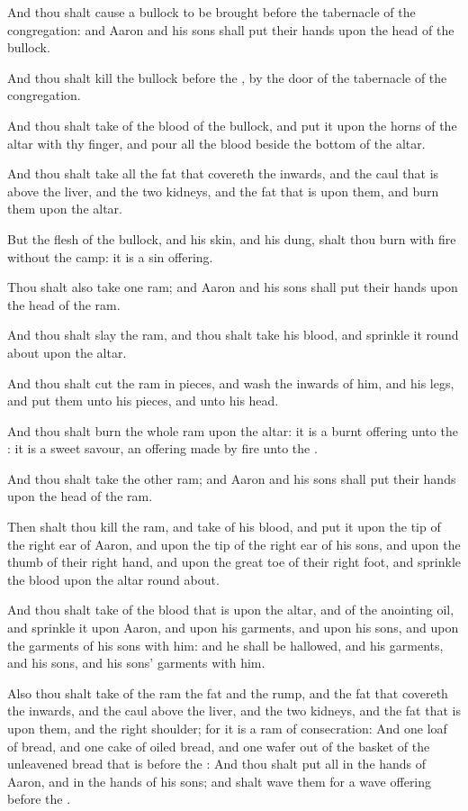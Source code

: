 \verse And thou shalt cause a bullock to be brought before the
tabernacle of the congregation: and Aaron and his sons shall put their
hands upon the head of the bullock.

\verse And thou shalt kill the bullock before the \LORD, by the door of
the tabernacle of the congregation.

\verse And thou shalt take of the blood of the bullock, and put it upon
the horns of the altar with thy finger, and pour all the blood beside
the bottom of the altar.

\verse And thou shalt take all the fat that covereth the inwards, and
the caul that is above the liver, and the two kidneys, and the fat
that is upon them, and burn them upon the altar.

\verse But the flesh of the bullock, and his skin, and his dung, shalt
thou burn with fire without the camp: it is a sin offering.

\verse Thou shalt also take one ram; and Aaron and his sons shall put
their hands upon the head of the ram.

\verse And thou shalt slay the ram, and thou shalt take his blood, and
sprinkle it round about upon the altar.

\verse And thou shalt cut the ram in pieces, and wash the inwards of
him, and his legs, and put them unto his pieces, and unto his head.

\verse And thou shalt burn the whole ram upon the altar: it is a burnt
offering unto the \LORD: it is a sweet savour, an offering made by fire
unto the \LORD.

\verse And thou shalt take the other ram; and Aaron and his sons shall
put their hands upon the head of the ram.

\verse Then shalt thou kill the ram, and take of his blood, and put it
upon the tip of the right ear of Aaron, and upon the tip of the right
ear of his sons, and upon the thumb of their right hand, and upon the
great toe of their right foot, and sprinkle the blood upon the altar
round about.

\verse And thou shalt take of the blood that is upon the altar, and of
the anointing oil, and sprinkle it upon Aaron, and upon his garments,
and upon his sons, and upon the garments of his sons with him: and he
shall be hallowed, and his garments, and his sons, and his sons'
garments with him.

\verse Also thou shalt take of the ram the fat and the rump, and the
fat that covereth the inwards, and the caul above the liver, and the
two kidneys, and the fat that is upon them, and the right shoulder;
for it is a ram of consecration: \verse And one loaf of bread, and one
cake of oiled bread, and one wafer out of the basket of the unleavened
bread that is before the \LORD: \verse And thou shalt put all in the
hands of Aaron, and in the hands of his sons; and shalt wave them for
a wave offering before the \LORD.

